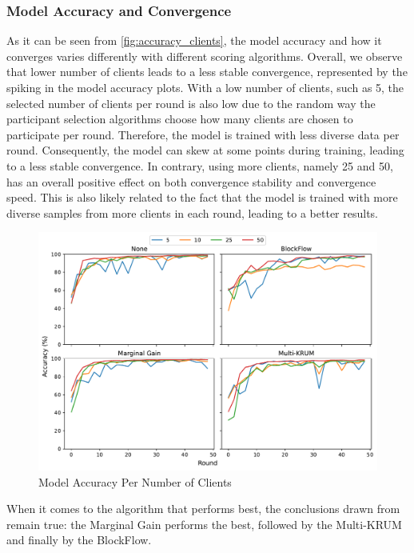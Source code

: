 \subsubsection{Model Accuracy and Convergence}

As it can be seen from \autoref{fig:accuracy_clients}, the model accuracy and how it converges varies differently with different scoring algorithms. Overall, we observe that lower number of clients leads to a less stable convergence, represented by the spiking in the model accuracy plots. With a low number of clients, such as 5, the selected number of clients per round is also low due to the random way the participant selection algorithms choose how many clients are chosen to participate per round. Therefore, the model is trained with less diverse data per round. Consequently, the model can skew at some points during training, leading to a less stable convergence. In contrary, using more clients, namely 25 and 50, has an overall positive effect on both convergence stability and convergence speed. This is also likely related to the fact that the model is trained with more diverse samples from more clients in each round, leading to a better results.

\begin{figure}[!ht]
    \centering
    \includegraphics[width=\textwidth]{graphics/clients/accuracy.pdf}
    \caption{Model Accuracy Per Number of Clients}
    \label{fig:accuracy_clients}
\end{figure}

When it comes to the algorithm that performs best, the conclusions drawn from  remain true: the Marginal Gain performs the best, followed by the Multi-KRUM and finally by the BlockFlow.

